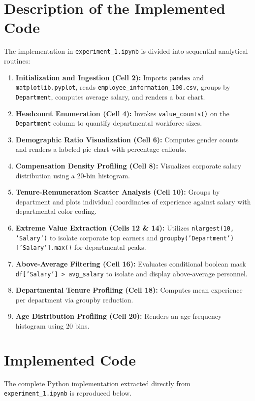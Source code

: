 \section{Description of the Implemented Code}
The implementation in \texttt{experiment\_1.ipynb} is divided into sequential analytical routines:
\begin{enumerate}
    \item \textbf{Initialization and Ingestion (Cell 2):} Imports \texttt{pandas} and \texttt{matplotlib.pyplot}, reads \texttt{employee\_information\_100.csv}, groups by \texttt{Department}, computes average salary, and renders a bar chart.
    \item \textbf{Headcount Enumeration (Cell 4):} Invokes \texttt{value\_counts()} on the \texttt{Department} column to quantify departmental workforce sizes.
    \item \textbf{Demographic Ratio Visualization (Cell 6):} Computes gender counts and renders a labeled pie chart with percentage callouts.
    \item \textbf{Compensation Density Profiling (Cell 8):} Visualizes corporate salary distribution using a 20-bin histogram.
    \item \textbf{Tenure-Remuneration Scatter Analysis (Cell 10):} Groups by department and plots individual coordinates of experience against salary with departmental color coding.
    \item \textbf{Extreme Value Extraction (Cells 12 \& 14):} Utilizes \texttt{nlargest(10, 'Salary')} to isolate corporate top earners and \texttt{groupby('Department')['Salary'].max()} for departmental peaks.
    \item \textbf{Above-Average Filtering (Cell 16):} Evaluates conditional boolean mask \texttt{df['Salary'] > avg\_salary} to isolate and display above-average personnel.
    \item \textbf{Departmental Tenure Profiling (Cell 18):} Computes mean experience per department via groupby reduction.
    \item \textbf{Age Distribution Profiling (Cell 20):} Renders an age frequency histogram using 20 bins.
\end{enumerate}

\section{Implemented Code}
The complete Python implementation extracted directly from \texttt{experiment\_1.ipynb} is reproduced below.

